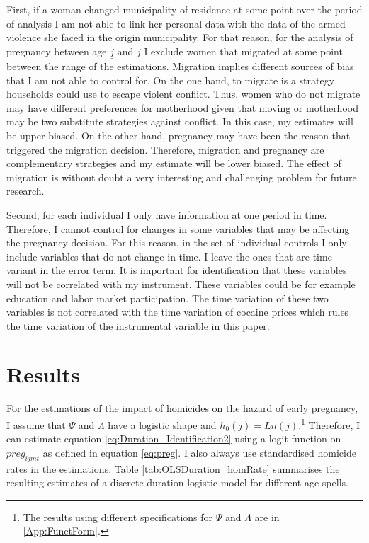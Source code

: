 \documentclass[a4paper,10pt,twocolumn,preprint,3p,authoryear]{elsarticle}
\begin{document}
First, if a woman changed municipality of residence at some point over the period of analysis I am not able to link her personal data with the data of the armed violence she faced in the origin municipality. For that reason, for the analysis of pregnancy between age $\underline{j}$ and $\bar{j}$ I exclude women that migrated at some point between the range of the estimations. Migration implies different sources of bias that I am not able to control for. On the one hand, to migrate is a strategy households could use to escape violent conflict. Thus, women who do not migrate may have different preferences for motherhood given that moving or motherhood may be two substitute strategies against conflict.  In this case, my estimates will be upper biased. On the other hand, pregnancy may have been the reason that triggered the migration decision. Therefore, migration and pregnancy are complementary strategies and my estimate will be lower biased. The effect of migration is without doubt a very interesting and challenging problem for future research.

Second, for each individual I only have information at one period in time. Therefore, I cannot control for changes in some variables that may be affecting the pregnancy decision. For this reason, in the set of individual controls I only include variables that do not change in time. I leave the ones that are time variant in the error term. It is important for identification that these variables will not be correlated with my instrument. These variables could be for example education and labor market participation. The time variation of these two variables is not correlated with the time variation of cocaine prices which rules the time variation of the instrumental variable in this paper. 

\section{Results\label{sec:Result}}

For the estimations of the impact of homicides on the hazard of early pregnancy, I assume that $\Psi$ and $\Lambda$ have a logistic shape and  $h_{0}\left(j\right)=Ln\left( j \right)$.\footnote{The results using different specifications for $\Psi$ and $\Lambda$ are in \ref{App:FunctForm}.} Therefore, I can estimate equation \ref{eq:Duration_Identification2} using a logit function on $preg_{ijmt}$ as defined in equation \ref{eq:preg}. I also always use standardised homicide rates in the estimations. Table \ref{tab:OLSDuration_homRate} summarises the resulting estimates of a discrete duration logistic model for different age spells.
\end{document}
